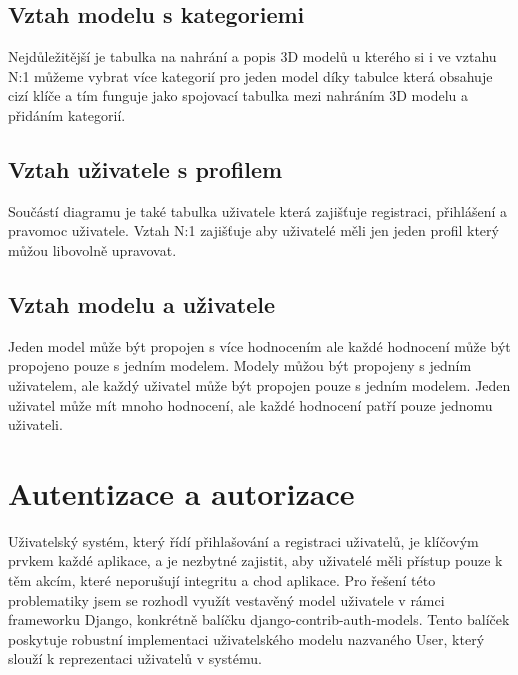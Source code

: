 \documentclass[12pt, a4paper,
twoside,        %
openright
]{report}
\begin{document}
		\subsection[Vztah modelu s kategoriemi]{Vztah modelu s kategoriemi} Nejdůležitější je tabulka na nahrání a popis 3D modelů u kterého si i ve vztahu N:1 můžeme vybrat více kategorií pro jeden model díky tabulce která obsahuje cizí klíče a tím funguje jako spojovací tabulka mezi nahráním 3D modelu a přidáním kategorií.
		\subsection[Vztah uživatele s profilem]{Vztah uživatele s profilem}
		Součástí diagramu je také tabulka uživatele která zajišťuje registraci, přihlášení a pravomoc uživatele. Vztah N:1 zajišťuje aby uživatelé měli jen jeden profil který můžou libovolně upravovat.
		\subsection[Vztah modelu a uživatele]{Vztah modelu a uživatele}
		Jeden model může být propojen s více hodnocením ale každé hodnocení může být propojeno pouze s jedním modelem. Modely můžou být propojeny s jedním uživatelem, ale každý uživatel může být propojen pouze s jedním modelem. Jeden uživatel může mít mnoho hodnocení, ale každé hodnocení patří pouze jednomu uživateli. 
	\newpage	
	\section[Autentizace a autorizace]{Autentizace a autorizace}
	
Uživatelský systém, který řídí přihlašování a registraci uživatelů, je klíčovým prvkem každé aplikace, a je nezbytné zajistit, aby uživatelé měli přístup pouze k těm akcím, které neporušují integritu a chod aplikace. Pro řešení této problematiky jsem se rozhodl využít vestavěný model uživatele v rámci frameworku Django, konkrétně balíčku django-contrib-auth-models. Tento balíček poskytuje robustní implementaci uživatelského modelu nazvaného User, který slouží k reprezentaci uživatelů v systému.
		
\end{document}
